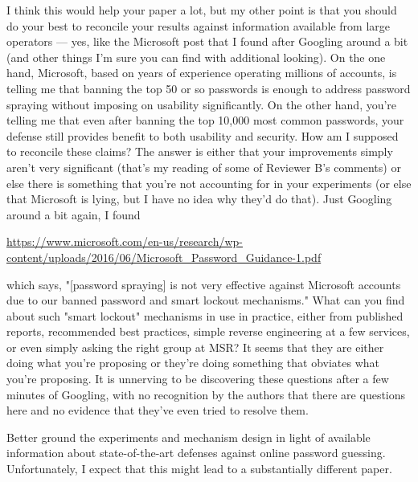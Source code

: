 I think this would help your paper a lot, but my other point is that
you should do your best to reconcile your results against information
available from large operators --- yes, like the Microsoft post that I
found after Googling around a bit (and other things I'm sure you can
find with additional looking).  On the one hand, Microsoft, based on
years of experience operating millions of accounts, is telling me that
banning the top 50 or so passwords is enough to address password
spraying without imposing on usability significantly.  On the other
hand, you're telling me that even after banning the top 10,000 most
common passwords, your defense still provides benefit to both
usability and security.  How am I supposed to reconcile these claims?
The answer is either that your improvements simply aren't very
significant (that's my reading of some of Reviewer B's comments) or
else there is something that you're not accounting for in your
experiments (or else that Microsoft is lying, but I have no idea why
they'd do that).  Just Googling around a bit again, I found

\url{https://www.microsoft.com/en-us/research/wp-content/uploads/2016/06/Microsoft_Password_Guidance-1.pdf}

which says, "[password spraying] is not very effective against
Microsoft accounts due to our banned password and smart lockout
mechanisms."  What can you find about such "smart lockout" mechanisms
in use in practice, either from published reports, recommended best
practices, simple reverse engineering at a few services, or even
simply asking the right group at MSR?  It seems that they are either
doing what you're proposing or they're doing something that obviates
what you're proposing.  It is unnerving to be discovering these
questions after a few minutes of Googling, with no recognition by the
authors that there are questions here and no evidence that they've
even tried to resolve them.


	Better ground the experiments and mechanism design in light of
	available information about state-of-the-art defenses against online
	password guessing.  Unfortunately, I expect that this might lead to a
	substantially different paper.
